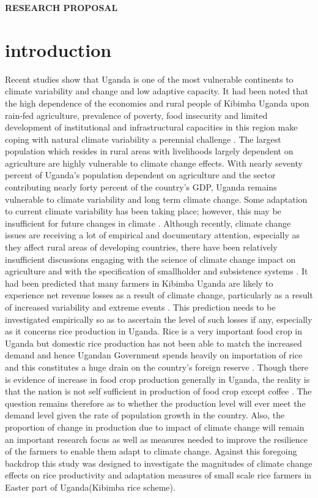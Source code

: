 \documentclass{article}                    %
\begin{document}
 
\textbf{{ RESEARCH PROPOSAL} }  
\section{ introduction}    
Recent studies show that Uganda is one of the most vulnerable continents to climate variability and change and low adaptive capacity. It had been noted that the high dependence of the economies and rural people of Kibimba Uganda upon rain-fed agriculture, prevalence of poverty, food insecurity and limited development of institutional and infrastructural capacities in this region make coping with natural climate variability a perennial challenge . The largest population which resides in rural areas with livelihoods largely dependent on agriculture are highly vulnerable to climate change effects. With nearly seventy percent of Uganda's population dependent on agriculture and the sector contributing nearly forty percent of the country's GDP, Uganda remains vulnerable to climate variability and long term climate change. Some adaptation to current climate variability has been taking place; however, this may be insufficient for future changes in climate . 
Although recently, climate change issues are receiving a lot of empirical and documentary attention, especially as they affect rural areas of developing countries, there have been relatively insufficient discussions engaging with the science of climate change impact on agriculture and with the specification of smallholder and subsistence systems . It had been predicted that many farmers in Kibimba Uganda are likely to experience net revenue losses as a result of climate change, particularly as a result of increased variability and extreme events . This prediction needs to be investigated empirically so as to ascertain the level of such losses if any, especially as it concerns rice production in Uganda. Rice is a very important food crop in Uganda but domestic rice production has not been able to match the increased demand and hence Ugandan Government spends heavily on importation of rice and this constitutes a huge drain on the country's foreign reserve . 
Though there is evidence of increase in food crop production generally in Uganda, the reality is that the nation is not self sufficient in production of food crop except coffee . The question remains therefore as to whether the production level will ever meet the demand level given the rate of population growth in the country. Also, the proportion of change in production due to impact of climate change will remain an important research focus as well as measures needed to improve the resilience of the farmers to enable them adapt to climate change. Against this foregoing backdrop this study was designed to investigate the magnitudes of climate change effects on rice productivity and adaptation measures of small scale rice farmers in Easter part of Uganda(Kibimba rice scheme).
\end{document}
